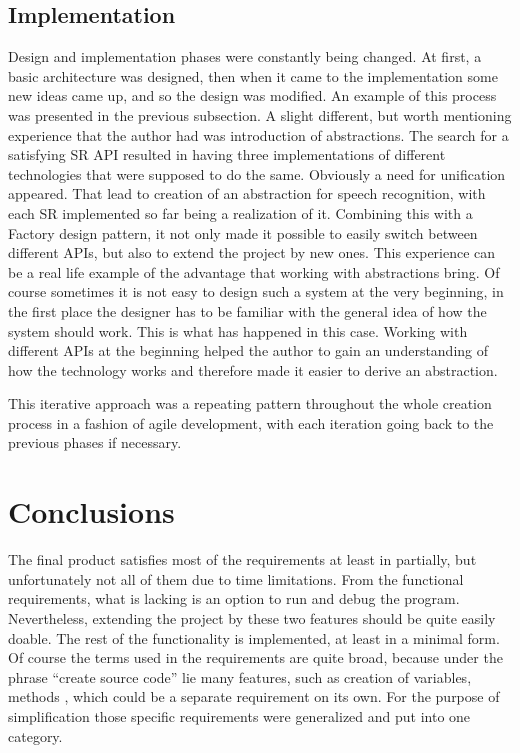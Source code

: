 \subsection{Implementation}
Design and implementation phases were constantly being changed. At first, a basic architecture was designed, then when it came to the implementation some new ideas came up, and so the design was modified. An example of this process was presented in the previous subsection. A slight different, but worth mentioning experience that the author had was introduction of abstractions. The search for a satisfying SR API resulted in having three implementations of different technologies that were supposed to do the same. Obviously a need for unification appeared. That lead to creation of an abstraction for speech recognition, with each SR implemented so far being a realization of it. Combining this with a Factory design pattern, it not only made it possible to easily switch between different APIs, but also to extend the project by new ones. This experience can be a real life example of the advantage that working with abstractions bring. Of course sometimes it is not easy to design such a system at the very beginning, in the first place the designer has to be familiar with the general idea of how the system should work. This is what has happened in this case. Working with different APIs at the beginning helped the author to gain an understanding of how the technology works and therefore made it easier to derive an abstraction.

This iterative approach was a repeating pattern throughout the whole creation process in a fashion of agile development, with each iteration going back to the previous phases if necessary.

\section{Conclusions}

The final product satisfies most of the requirements at least in partially, but unfortunately not all of them due to time limitations. From the functional requirements, what is lacking is an option to run and debug the program. Nevertheless, extending the project by these two features should be quite easily doable. The rest of the functionality is implemented, at least in a minimal form. Of course the terms used in the requirements are quite broad, because under the phrase ``create source code'' lie many features, such as creation of variables, methods \etc, which could be a separate requirement on its own. For the purpose of simplification those specific requirements were generalized and put into one category.

